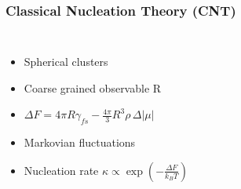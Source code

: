 \documentclass[smaller,notes=hide]{beamer}
\newlength{\wideitemsep}
\let\olditem\item
\renewcommand{\item}{\setlength{\itemsep}{\wideitemsep}\olditem}
\begin{document}
\begin{frame}
\frametitle{Classical Nucleation Theory (CNT)}
\begin{columns}
\begin{itemize}
\item Spherical clusters
\item Coarse grained observable R
\item $\Delta F = 4 \pi R \gamma_{fs} - \frac{4 \pi}{3} R^3  \rho \,\Delta |\mu| $
\item<2> Markovian fluctuations
\item<2> Nucleation rate $\kappa  \propto \exp \left( -\frac{\Delta F}{k_B T} \right) $

\end{itemize}
  \centering

\end{columns}
\end{frame}
\end{document}
